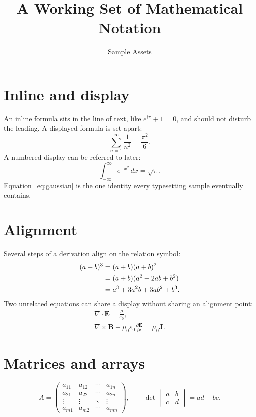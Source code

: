 \documentclass[11pt,a4paper]{article}
\title{A Working Set of Mathematical Notation}
\author{Sample Assets}
\date{}
\theoremstyle{plain}
\theoremstyle{definition}
\theoremstyle{remark}
\begin{document}
\maketitle

\section{Inline and display}

An inline formula sits in the line of text, like $e^{i\pi} + 1 = 0$, and should
not disturb the leading. A displayed formula is set apart:
\[
  \sum_{n=1}^{\infty} \frac{1}{n^{2}} = \frac{\pi^{2}}{6}.
\]
A numbered display can be referred to later:
\begin{equation}
  \label{eq:gaussian}
  \int_{-\infty}^{\infty} e^{-x^{2}} \, dx = \sqrt{\pi}.
\end{equation}
Equation~\eqref{eq:gaussian} is the one identity every typesetting sample
eventually contains.

\section{Alignment}

Several steps of a derivation align on the relation symbol:
\begin{align}
  (a + b)^{3} &= (a + b)(a + b)^{2} \notag \\
              &= (a + b)(a^{2} + 2ab + b^{2}) \notag \\
              &= a^{3} + 3a^{2}b + 3ab^{2} + b^{3}.
  \label{eq:cube}
\end{align}
Two unrelated equations can share a display without sharing an alignment point:
\begin{gather}
  \nabla \cdot \mathbf{E} = \frac{\rho}{\varepsilon_{0}}, \\
  \nabla \times \mathbf{B} - \mu_{0}\varepsilon_{0}
    \frac{\partial \mathbf{E}}{\partial t} = \mu_{0}\mathbf{J}.
\end{gather}

\section{Matrices and arrays}

\[
  A =
  \begin{pmatrix}
    a_{11} & a_{12} & \cdots & a_{1n} \\
    a_{21} & a_{22} & \cdots & a_{2n} \\
    \vdots & \vdots & \ddots & \vdots \\
    a_{m1} & a_{m2} & \cdots & a_{mn}
  \end{pmatrix},
  \qquad
  \det
  \begin{vmatrix}
    a & b \\
    c & d
  \end{vmatrix}
  = ad - bc .
\]
\end{document}
